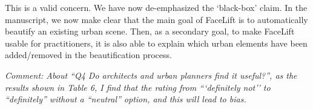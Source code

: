 \documentclass{paper}
\newenvironment{myquote}
{\definecolor{shadecolor}{rgb}{0.9,0.95,1} \begin{shaded*} \sf \em}
{\em\end{shaded*}}
\newcommand{\ns}[1]{\textcolor{red}{NS: #1}}
\begin{document}
\noindent This is a valid concern. We have now de-emphasized the `black-box' claim. In the manuscript, we now make clear that the main goal of FaceLift is to automatically beautify an existing urban scene. Then, as a secondary goal, to make FaceLift usable for practitioners, it is also able to explain which urban elements have been added/removed in the beautification process. 


\begin{myquote}
\noindent Comment: About ``Q4 Do architects and urban planners find it useful?'', as the results shown in Table 6, I find that the rating from ```definitely not'' to ``definitely'' without a ``neutral'' option, and this will lead to bias.
\end{myquote}
\end{document}
